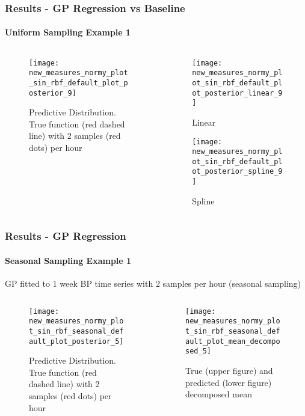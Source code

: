 \documentclass[
	8pt, %
]{beamer}
\begin{document}
\begin{frame}
	\frametitle{Results - GP Regression vs Baseline}
	\framesubtitle{Uniform Sampling Example 1}

	\begin{columns}[c] %
		\begin{column}{0.5\textwidth} %
				\begin{figure}
					\texttt{[image: new\_measures\_normy\_plot\_sin\_rbf\_default\_plot\_posterior\_9]}
					\caption{Predictive Distribution. True function (red dashed line) with 2 samples (red dots) per hour}
				\end{figure}
		\end{column}
		\begin{column}{0.5\textwidth} %
				\begin{figure}
					\texttt{[image: new\_measures\_normy\_plot\_sin\_rbf\_default\_plot\_posterior\_linear\_9]}
					\caption{Linear}
				\end{figure}

				\begin{figure}
					\texttt{[image: new\_measures\_normy\_plot\_sin\_rbf\_default\_plot\_posterior\_spline\_9]}
					\caption{Spline}
				\end{figure}
		\end{column}
	\end{columns}

\end{frame}



\begin{frame}
	\frametitle{Results - GP Regression}
	\framesubtitle{Seasonal Sampling Example  1}

	GP fitted to 1 week BP time series with 2 samples per hour (seasonal sampling)

		\begin{columns}[c] %
		\begin{column}{0.5\textwidth} %
				\begin{figure}
					\texttt{[image: new\_measures\_normy\_plot\_sin\_rbf\_seasonal\_default\_plot\_posterior\_5]}
					\caption{Predictive Distribution. True function (red dashed line) with 2 samples (red dots) per hour}
				\end{figure}
		\end{column}
		\begin{column}{0.5\textwidth} %
				\begin{figure}
					\texttt{[image: new\_measures\_normy\_plot\_sin\_rbf\_seasonal\_default\_plot\_mean\_decomposed\_5]}
					\caption{True (upper figure) and predicted (lower figure) decomposed mean}
				\end{figure}

		\end{column}
	\end{columns}

\end{frame}
\end{document}
